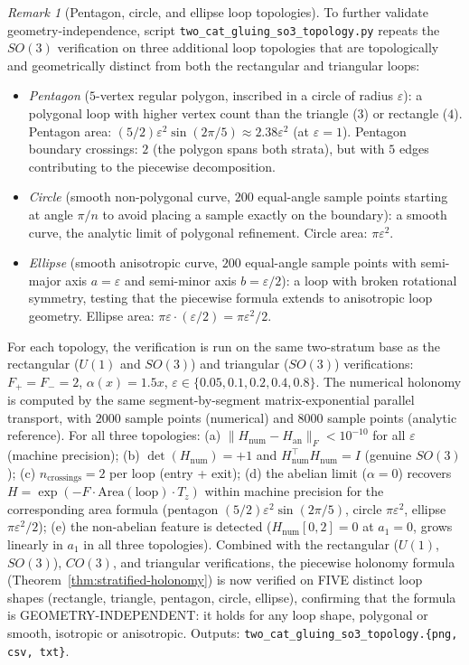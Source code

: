 \documentclass[11pt,a4paper]{article}
\theoremstyle{plain}
\theoremstyle{definition}
\theoremstyle{remark}
\newtheorem{remark}[theorem]{Remark}
\begin{document}
\begin{remark}[Pentagon, circle, and ellipse loop topologies]
\label{rem:2cat-gluing-so3-topology}
To further validate geometry-independence, script
\texttt{two\_cat\_gluing\_so3\_topology.py} repeats the $SO(3)$
verification on three additional loop topologies that are topologically
and geometrically distinct from both the rectangular and triangular
loops:
\begin{itemize}[leftmargin=*, itemsep=2pt]
\item \emph{Pentagon} ($5$-vertex regular polygon, inscribed in a
circle of radius $\varepsilon$): a polygonal loop with higher vertex
count than the triangle ($3$) or rectangle ($4$). Pentagon area:
$(5/2) \varepsilon^2 \sin(2\pi/5) \approx 2.38 \varepsilon^2$ (at
$\varepsilon = 1$). Pentagon boundary crossings: $2$ (the polygon
spans both strata), but with $5$ edges contributing to the piecewise
decomposition.
\item \emph{Circle} (smooth non-polygonal curve, $200$ equal-angle
sample points starting at angle $\pi/n$ to avoid placing a sample
exactly on the boundary): a smooth curve, the analytic limit of
polygonal refinement. Circle area: $\pi \varepsilon^2$.
\item \emph{Ellipse} (smooth anisotropic curve, $200$ equal-angle
sample points with semi-major axis $a = \varepsilon$ and semi-minor
axis $b = \varepsilon/2$): a loop with broken rotational symmetry,
testing that the piecewise formula extends to anisotropic loop
geometry. Ellipse area: $\pi \varepsilon \cdot (\varepsilon/2) =
\pi\varepsilon^2/2$.
\end{itemize}
For each topology, the verification is run on the same two-stratum
base as the rectangular ($U(1)$ and $SO(3)$) and triangular ($SO(3)$)
verifications: $F_+ = F_- = 2$, $\alpha(x) = 1.5 x$, $\varepsilon
\in \{0.05, 0.1, 0.2, 0.4, 0.8\}$. The numerical holonomy is computed
by the same segment-by-segment matrix-exponential parallel transport,
with $2000$ sample points (numerical) and $8000$ sample points
(analytic reference). For all three topologies: (a)
$\|H_{\mathrm{num}} - H_{\mathrm{an}}\|_F < 10^{-10}$ for all
$\varepsilon$ (machine precision); (b) $\det(H_{\mathrm{num}}) = +1$
and $H_{\mathrm{num}}^\top H_{\mathrm{num}} = I$ (genuine $SO(3)$);
(c) $n_{\mathrm{crossings}} = 2$ per loop (entry + exit); (d) the
abelian limit ($\alpha = 0$) recovers $H = \exp(-F \cdot
\mathrm{Area}(\mathrm{loop}) \cdot T_z)$ within machine precision for
the corresponding area formula (pentagon $(5/2)\varepsilon^2
\sin(2\pi/5)$, circle $\pi\varepsilon^2$, ellipse $\pi\varepsilon^2
/2$); (e) the non-abelian feature is detected ($H_{\mathrm{num}}[0,2]
= 0$ at $a_1 = 0$, grows linearly in $a_1$ in all three topologies).
Combined with the rectangular ($U(1)$, $SO(3)$), $CO(3)$, and
triangular verifications, the piecewise holonomy formula
(Theorem~\ref{thm:stratified-holonomy}) is now verified on FIVE
distinct loop shapes (rectangle, triangle, pentagon, circle,
ellipse), confirming that the formula is GEOMETRY-INDEPENDENT: it
holds for any loop shape, polygonal or smooth, isotropic or
anisotropic. Outputs:
\texttt{two\_cat\_gluing\_so3\_topology.\{png, csv, txt\}}.
\end{remark}
\end{document}
